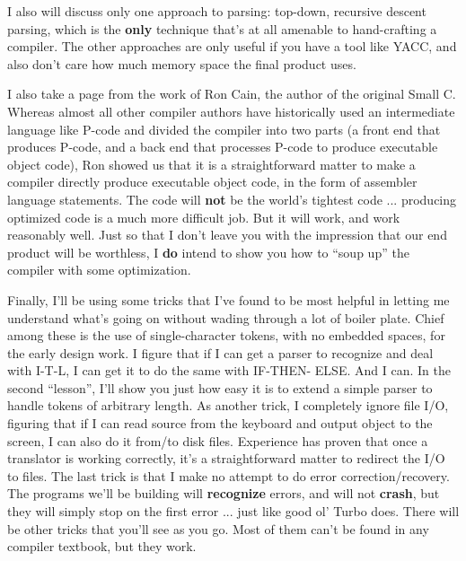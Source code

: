 I  also  will  discuss only one approach  to  parsing:  top-down,
recursive descent parsing, which is the  {\bfseries only} technique that's
at  all   amenable  to  hand-crafting  a  compiler.    The  other
approaches are only useful if you have a tool like YACC, and also
don't care how much memory space the final product uses.

I  also take a page from the work of Ron Cain, the author of  the
original Small C.  Whereas almost all other compiler authors have
historically  used  an  intermediate  language  like  P-code  and
divided  the  compiler  into two parts (a front end that produces
P-code,  and   a  back  end  that  processes  P-code  to  produce
executable   object  code),  Ron  showed  us   that   it   is   a
straightforward  matter  to  make  a  compiler  directly  produce
executable  object  code,  in  the  form  of  assembler  language
statements.  The code will {\bfseries not} be the world's tightest code ...
producing optimized code is  a  much  more  difficult job. But it
will work, and work reasonably well.  Just so that I  don't leave
you with the impression that our end product will be worthless, I
{\bfseries do} intend to show you how  to  ``soup up'' the compiler with some
optimization.

Finally, I'll be  using  some  tricks  that I've found to be most
helpful in letting  me  understand what's going on without wading
through a lot of boiler plate.  Chief among these  is  the use of
single-character tokens, with no embedded spaces,  for  the early
design work.  I figure that  if  I  can get a parser to recognize
and deal with I-T-L, I can  get  it  to do the same with IF-THEN-
ELSE.  And I can.  In the second ``lesson'',   I'll  show  you just
how easy it  is  to  extend  a  simple parser to handle tokens of
arbitrary length.  As another  trick,  I  completely  ignore file
I/O, figuring that  if  I  can  read source from the keyboard and
output object to the screen, I can also do it from/to disk files.
Experience  has  proven  that  once  a   translator   is  working
correctly, it's a  straightforward  matter to redirect the I/O to
files.    The last trick is that I make no attempt  to  do  error
correction/recovery.   The   programs   we'll  be  building  will
{\bfseries recognize} errors, and will not {\bfseries crash}, but they  will  simply stop
on the first error ... just like good ol' Turbo does.  There will
be  other tricks that you'll see as you go. Most of them can't be
found in any compiler textbook, but they work.

